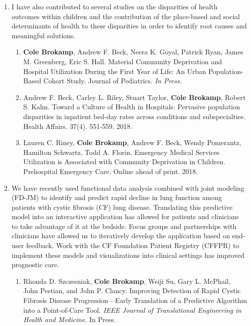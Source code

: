 \documentclass{nihbiosketch}
\begin{document}
\begin{enumerate}
\item I have also contributed to several studies on the disparities of health outcomes within children and the contribution of the place-based and social determinants of health to these disparities in order to identify root causes and meaningful solutions.

\begin{enumerate}

	\item \textbf{Cole Brokamp}, Andrew F. Beck, Neera K. Goyal, Patrick Ryan, James M. Greenberg, Eric S. Hall. Material Community Deprivation and Hospital Utilization During the First Year of Life: An Urban Population-Based Cohort Study. Journal of Pediatrics. \textit{In Press.}
	
	\item Andrew F. Beck, Carley L. Riley, Stuart Taylor, \textbf{Cole Brokamp}, Robert S. Kahn. Toward a Culture of Health in Hospitals: Pervasive population disparities in inpatient bed-day rates across conditions and subspecialties. Health Affairs. 37(4). 551-559. 2018.
		
	\item Lauren C. Riney, \textbf{Cole Brokamp}, Andrew F. Beck, Wendy Pomerantz, Hamilton Schwartz, Todd A. Florin. Emergency Medical Services Utilization is Associated with Community Deprivation in Children. Prehospital Emergency Care. Online ahead of print. 2018.


\end{enumerate}

\item We have recently used functional data analysis combined with joint modeling (FD-JM) to identify and predict rapid decline in lung function among patients with cystic fibrosis (CF) lung disease. Translating this predictive model into an interactive application has allowed for patients and clinicians to take advantage of it at the bedside.  Focus groups and partnerships with clinicians have allowed us to iteratively develop the application based on end-user feedback. Work with the CF Foundation Patient Registry (CFFPR) to implement these models and visualizations into clinical settings has improved prognostic care.

\begin{enumerate}
	
	\item Rhonda D. Szczesniak, \textbf{Cole Brokamp}, Weiji Su, Gary L. McPhail, John Pestian, and John P. Clancy. Improving Detection of Rapid Cystic Fibrosis Disease Progression—Early Translation of a Predictive Algorithm into a Point-of-Care Tool. \textit{IEEE Journal of Translational Engineering in Health and Medicine.} In Press.


\end{enumerate}
\end{enumerate}
\end{document}
